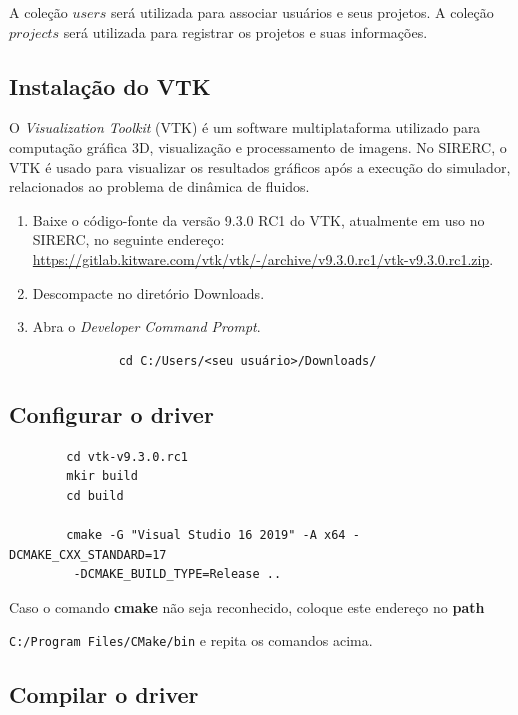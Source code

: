 \documentclass[a4paper,11pt]{article}
\newcommand{\sistema}{\textsf{SIRERC}}
\begin{document}
A coleção $users$ será utilizada para associar usuários e seus projetos. A coleção $projects$ será utilizada para registrar os projetos e suas informações. 

\color{black}

\newpage
\subsection{Instalação do VTK}
\label{vtk}

O \emph{Visualization Toolkit} (VTK) é um software multiplataforma utilizado para computação gráfica 3D, visualização e processamento de imagens. No \sistema{}, o VTK é usado para visualizar os resultados gráficos após a execução do simulador, relacionados ao problema de dinâmica de fluidos.

\begin{enumerate}
	\item Baixe o código-fonte da versão 9.3.0 RC1 do VTK, atualmente em uso no \sistema{}, no seguinte endereço: \url{https://gitlab.kitware.com/vtk/vtk/-/archive/v9.3.0.rc1/vtk-v9.3.0.rc1.zip}.
	\item Descompacte no diretório Downloads.
	\item Abra o \textit{Developer Command Prompt}.
	\begin{mdframed}
		\begin{verbatim}
			cd C:/Users/<seu usuário>/Downloads/
		\end{verbatim}
	\end{mdframed}
\end{enumerate}


\subsection*{Configurar o driver}

\begin{mdframed}
	\begin{verbatim}
		cd vtk-v9.3.0.rc1
		mkir build
		cd build
		
		cmake -G "Visual Studio 16 2019" -A x64 -DCMAKE_CXX_STANDARD=17
		 -DCMAKE_BUILD_TYPE=Release ..
	\end{verbatim}
\end{mdframed}

Caso o comando \textbf{cmake} não seja reconhecido, coloque este endereço no \textbf{path}

{\tt C:/Program Files/CMake/bin} e repita os comandos acima.

\subsection*{Compilar o driver}
\end{document}
